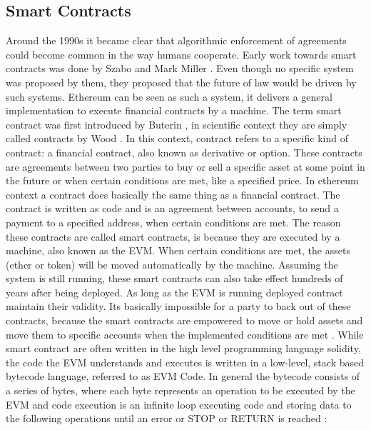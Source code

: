 \subsection{Smart Contracts}
\label{subsec:background:first_section:first_subsection}
Around the 1990s it became clear that algorithmic enforcement of agreements could become common in the way humans cooperate. Early work towards smart contracts was done by Szabo \cite{szabo1997formalizing} and Mark Miller \cite{miller1997future}. Even though no specific system was proposed by them, they proposed that the future of law would be driven by such systems. Ethereum can be seen as such a system, it delivers a general implementation to execute financial contracts by a machine. The term smart contract was first introduced by Buterin \cite{buterin2013ethereum}, in scientific context they are simply called contracts by Wood \cite{wood2014ethereum}. In this context, contract refers to a specific kind of contract: a financial contract, also known as derivative or option. These contracts are agreements between two parties to buy or sell a specific asset at some point in the future or when certain conditions are met, like a specified price. In ethereum context a contract does basically the same thing as a financial contract. The contract is written as code and is an agreement between accounts, to send a payment to a specified address, when certain conditions are met. The reason these contracts are called smart contracts, is because they are executed by a machine, also known as the \ac{EVM}. When certain conditions are met, the assets (ether or token) will be moved automatically by the machine. Assuming the system is still running, these smart contracts can also take effect hundreds of years after being deployed. As long as the \ac{EVM} is running deployed contract maintain their validity. Its basically impossible for a party to back out of these contracts, because the smart contracts are empowered to move or hold assets and move them to specific accounts when the implemented conditions are met \cite{dannen2017introducing}. While smart contract are often written in the high level programming language solidity, the code the \ac{EVM} understands and executes is written in a low-level, stack based bytecode language, referred to as \ac{EVM Code}. In general the bytecode consists of a series of bytes, where each byte represents an operation to be executed by the \ac{EVM} and code execution is an infinite loop executing code and storing data to the following operations until an error or STOP or RETURN is reached \cite{buterin2013ethereum}:

